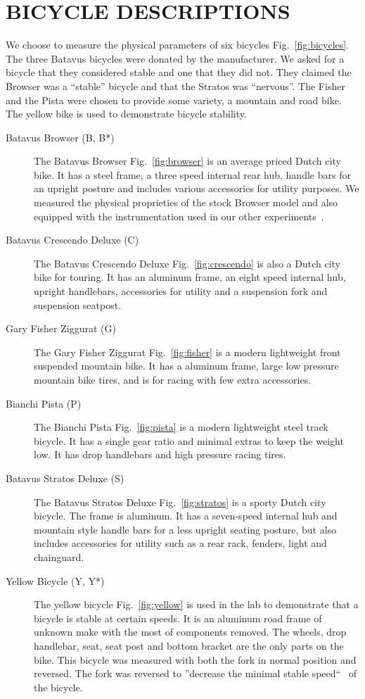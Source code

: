 \documentclass{bmd2010p}
\begin{document}
\section{BICYCLE DESCRIPTIONS}
We choose to measure the physical parameters of six bicycles
Fig.~\ref{fig:bicycles}. The three Batavus bicycles were donated by the
manufacturer. We asked for a bicycle that they considered stable and one that
they did not. They claimed the Browser was a ``stable'' bicycle and that the
Stratos was ``nervous''. The Fisher and the Pista were chosen to provide some
variety, a mountain and road bike. The yellow bike is used to demonstrate
bicycle stability.
\begin{description}
    \item[Batavus Browser (B, B*)]{The Batavus Browser Fig.~\ref{fig:browser}
        is an average priced Dutch city
        bike. It has a steel frame, a three speed internal rear hub, handle
        bars for an upright posture and includes various accessories for utility
        purposes. We measured the physical proprieties of the stock Browser model and
        also equipped with the instrumentation used in our other
        experiments~\cite{Kooijman2009}.}
    \item[Batavus Crescendo Deluxe (C)]{The Batavus Crescendo Deluxe
        Fig.~\ref{fig:crescendo} is also a
        Dutch city bike for touring. It has an aluminum frame, an
        eight speed internal hub, upright handlebars, accessories for utility
        and a suspension fork and suspension seatpost.}
    \item[Gary Fisher Ziggurat (G)]{The Gary Fisher Ziggurat Fig.~\ref{fig:fisher} is a modern
        lightweight front suspended mountain bike. It has a aluminum frame, large low
        pressure mountain bike tires, and is for racing with few extra accessories.}
    \item[Bianchi Pista (P)]{The Bianchi Pista Fig.~\ref{fig:pista} is a modern lightweight steel track
        bicycle. It has a single gear ratio and minimal extras to keep the
        weight low. It has drop handlebars and high pressure racing tires.}
    \item[Batavus Stratos Deluxe (S)]{The Batavus Stratos Deluxe
        Fig.~\ref{fig:stratos} is a sporty Dutch city bicycle. The frame is
        aluminum. It has a seven-speed internal hub and mountain
        style handle bars for a less upright seating posture, but also includes
        accessories for utility such as a rear rack, fenders, light and
        chainguard.}
    \item[Yellow Bicycle (Y, Y*)]{The yellow bicycle Fig.~\ref{fig:yellow} is used in the lab to
        demonstrate that a bicycle is stable at certain speeds. It is an
        aluminum road frame of unknown make with the most of components
        removed. The wheels, drop handlebar, seat, seat post and bottom bracket
        are the only parts on the bike. This bicycle was measured with both the
        fork in normal position and reversed. The fork was reversed to
        ''decrease the minimal stable speed``~\cite{Kooijman2006} of the bicycle.}
\end{description}
\end{document}
